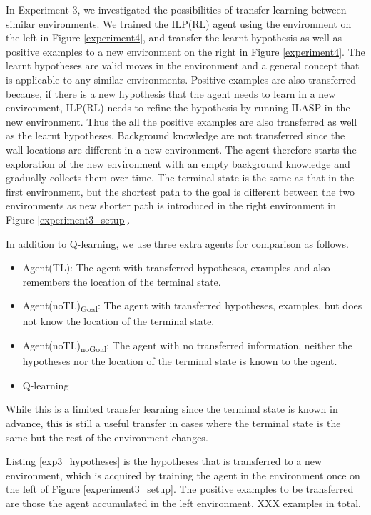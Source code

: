 In Experiment 3, we investigated the possibilities of transfer learning between similar environments.
We trained the ILP(RL) agent using the environment on the left in Figure \ref{experiment4}, 
and transfer the learnt hypothesis as well as positive examples to a new environment on the right in Figure \ref{experiment4}.
The learnt hypotheses are valid moves in the environment and a general concept that is applicable to any similar environments. 
Positive examples are also transferred because, if there is a new hypothesis that the agent needs to learn in a new environment, 
ILP(RL) needs to refine the hypothesis by running ILASP in the new environment.
Thus the all the positive examples are also transferred as well as the learnt hypotheses. 
Background knowledge are not transferred since the wall locations are different in a new environment.
The agent therefore starts the exploration of the new environment with an empty background knowledge and gradually collects them over time.
The terminal state is the same as that in the first environment, but the shortest path to the goal is different between the two environments as new shorter path is introduced in the right environment in Figure \ref{experiment3_setup}.

In addition to Q-learning, we use three extra agents for comparison as follows. 

\begin{itemize}
    \item Agent(TL): The agent with transferred hypotheses, examples and also remembers the location of the terminal state.
    \item Agent(noTL)\textsubscript{Goal}: The agent with transferred hypotheses, examples, but does not know the location of the terminal state.
    \item Agent(noTL)\textsubscript{noGoal}: The agent with no transferred information, neither the hypotheses nor the location of the terminal state is known to the agent.
    \item Q-learning
\end{itemize}

While this is a limited transfer learning since the terminal state is known in advance, this is still a useful transfer in cases where the terminal state is the same but the rest of the environment changes.

Listing \ref{exp3_hypotheses} is the hypotheses that is transferred to a new environment, which is acquired by training the agent in the environment once on the left of Figure \ref{experiment3_setup}.
The positive examples to be transferred are those the agent accumulated in the left environment, XXX examples in total.

